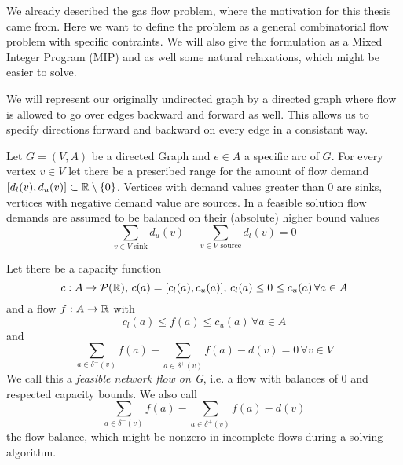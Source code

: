 We already described the gas flow problem, where the motivation for this thesis came from. Here we want to define the 
problem as a general combinatorial flow problem with specific contraints. We will also give the formulation as a Mixed 
Integer Program (MIP) and as well some natural relaxations, which might be easier to solve.

We will represent our originally undirected graph by a directed graph where flow is allowed to go over edges backward 
and forward as well. This allows us to specify directions forward and backward on every edge in a consistant way. 


\begin{definition}
 Let $G=(V,A)$ be a directed Graph and $e \in A$ a specific arc of $G$. For every vertex $v\in V$ let there be a 
prescribed range for the amount of flow demand $[d_l(v), d_u(v)]\subset \mathbb{R} \setminus \{0\}$. Vertices with demand 
values greater than 0 are sinks, vertices with negative demand value are sources. In a feasible solution flow 
demands are assumed to be balanced on their (absolute) higher bound values 
$$\sum_{v \in V\textrm{ sink}}d_u(v)-\sum_{v \in V\textrm{ source}}d_l(v)=0$$ 

Let there be a capacity function 
$$c:A\to \mathcal{P}(\mathbb{R}), \, c(a)=[c_l(a), c_u(a)],\, c_l(a)\le 0 \le c_u(a) \, \forall a\in A$$
and a flow  $f: A\to \mathbb{R} $ with $$c_l(a)\le f(a)\le 
c_u(a)\, \forall a\in A$$ and $$\sum_{a\in\delta^-(v)}f(a)-\sum_{a\in\delta^+(v)}f(a)-d(v) = 0 \, \forall v\in V$$
We call this a \textit{feasible network flow on G}, i.e. a flow with balances of 0 and respected capacity bounds.
We also call $$\sum_{a\in \delta^-(v)}f(a)-\sum_{a\in\delta^+(v)}f(a)-d(v)$$ the flow balance, which might be nonzero 
in incomplete flows during a solving algorithm.\\
\end{definition}

